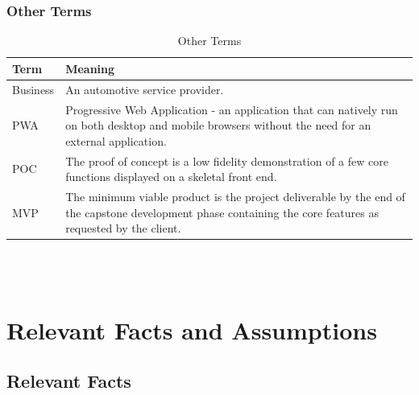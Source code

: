 \documentclass[12pt]{article}
\begin{document}
\subsubsection{Other Terms}
\begin{table}[H]
    \begin{tabularx}{\textwidth}{l X}
        \toprule
        \textbf{Term} & \textbf{Meaning} \\
        \midrule
        Business & An automotive service provider.\\
        PWA & Progressive Web Application - an application that can natively run on both desktop and mobile browsers without the need for an external application.\\
        POC & The proof of concept is a low fidelity demonstration of a few core functions displayed on a skeletal front end.\\
        MVP & The minimum viable product is the project deliverable by the end of the capstone development phase containing the core features as requested by the client.\\
        \bottomrule
    \end{tabularx} \\ \\
    \caption{Other Terms}
\end{table}

\section{Relevant Facts and Assumptions}

\subsection{Relevant Facts}
\end{document}
